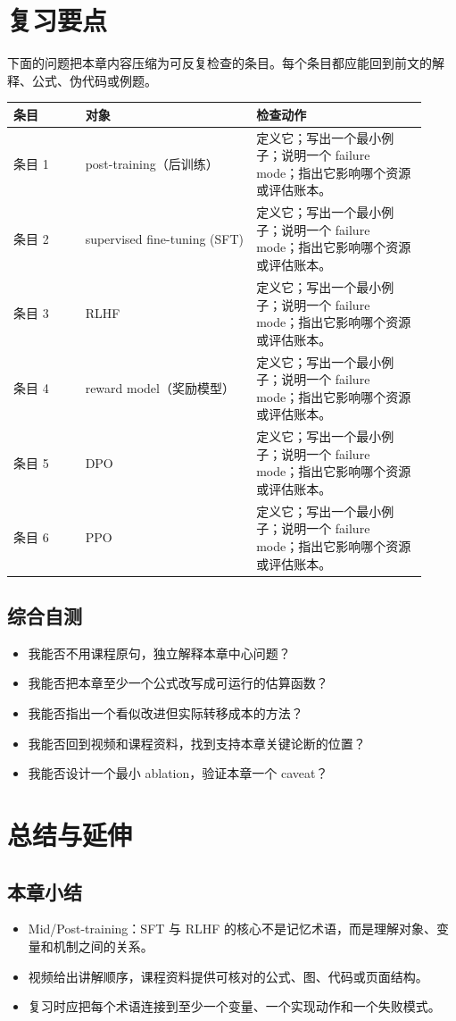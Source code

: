 \documentclass[a4paper]{article}
\begin{document}
\section{复习要点}
下面的问题把本章内容压缩为可反复检查的条目。每个条目都应能回到前文的解释、公式、伪代码或例题。
\begin{longtable}{p{0.16\linewidth}p{0.38\linewidth}p{0.38\linewidth}}
\toprule
\textbf{条目} & \textbf{对象} & \textbf{检查动作}\\
\midrule
条目 1 & post-training（后训练） & 定义它；写出一个最小例子；说明一个 failure mode；指出它影响哪个资源或评估账本。\\
条目 2 & supervised fine-tuning (SFT) & 定义它；写出一个最小例子；说明一个 failure mode；指出它影响哪个资源或评估账本。\\
条目 3 & RLHF & 定义它；写出一个最小例子；说明一个 failure mode；指出它影响哪个资源或评估账本。\\
条目 4 & reward model（奖励模型） & 定义它；写出一个最小例子；说明一个 failure mode；指出它影响哪个资源或评估账本。\\
条目 5 & DPO & 定义它；写出一个最小例子；说明一个 failure mode；指出它影响哪个资源或评估账本。\\
条目 6 & PPO & 定义它；写出一个最小例子；说明一个 failure mode；指出它影响哪个资源或评估账本。\\
\bottomrule
\end{longtable}
\subsection{综合自测}
\begin{itemize}
\item 我能否不用课程原句，独立解释本章中心问题？
\item 我能否把本章至少一个公式改写成可运行的估算函数？
\item 我能否指出一个看似改进但实际转移成本的方法？
\item 我能否回到视频和课程资料，找到支持本章关键论断的位置？
\item 我能否设计一个最小 ablation，验证本章一个 caveat？
\end{itemize}
\section{总结与延伸}
\subsection{本章小结}
\begin{itemize}
\item Mid/Post-training：SFT 与 RLHF 的核心不是记忆术语，而是理解对象、变量和机制之间的关系。
\item 视频给出讲解顺序，课程资料提供可核对的公式、图、代码或页面结构。
\item 复习时应把每个术语连接到至少一个变量、一个实现动作和一个失败模式。
\end{itemize}
\end{document}

